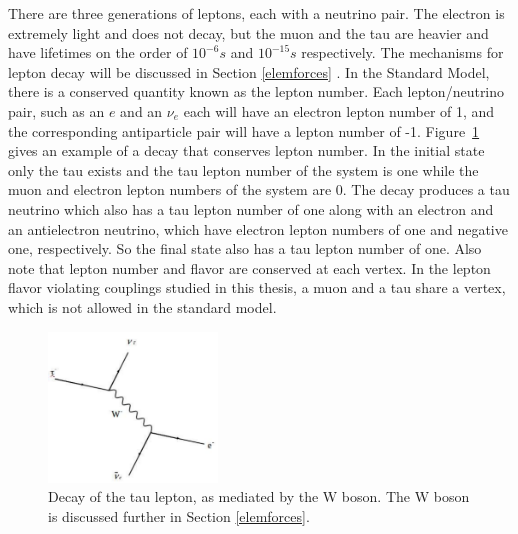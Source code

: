 \documentclass[oneside, letterpaper, oldfontcommands]{memoir}
\begin{document}

\qquad There are three generations of leptons, each with a neutrino pair. The electron is extremely light and does not decay, but the muon and the tau are heavier and have lifetimes on the order of $10^{-6}s$ and $10^{-15}s$ respectively\cite{Agashe:2014kda}. The mechanisms for lepton decay will be discussed in Section \ref{elemforces} . In the Standard Model, there is a conserved quantity known as the lepton number. Each lepton/neutrino pair, such as an $e$ and an $\nu_{e}$ each will have an electron lepton number of 1, and the corresponding antiparticle pair will have a lepton number of -1. Figure~\ref{fig:TauDecay} gives an example of a decay that conserves lepton number. In the initial state only the tau exists and the tau lepton number of the system is one while the muon and electron lepton numbers of the system are 0. The decay produces a tau neutrino which also has a tau lepton number of one along with an electron and an antielectron neutrino, which have electron lepton numbers of one and negative one, respectively. So the final state also has a tau lepton number of one. Also note that lepton number and flavor are conserved at each vertex. In the lepton flavor violating couplings studied in this thesis, a muon and a tau share a vertex, which is not allowed in the standard model. 

\begin{figure}[here]
\includegraphics[width=0.4\textwidth]{TauDecay.pdf}
\caption{Decay of the tau lepton, as mediated by the W boson. The W boson is discussed further in Section \ref{elemforces}.}
\label{fig:TauDecay}
\end{figure}
\end{document}
